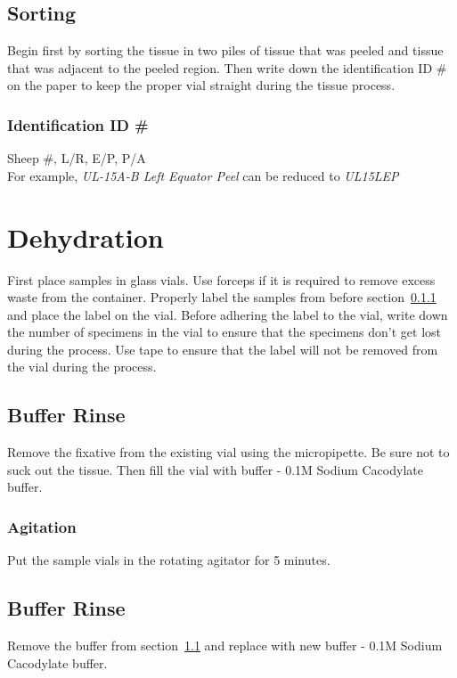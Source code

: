 \subsection{Sorting}\label{sorting}
Begin first by sorting the tissue in two piles of tissue that was peeled and
tissue that was adjacent to the peeled region.  Then write down the
identification ID \# on the paper to keep the proper vial straight during the
tissue process.  \\

\subsubsection{Identification ID \#}\label{identification}
Sheep \#, L/R, E/P, P/A\\

For example, {\it UL-15A-B Left Equator Peel} can be reduced to {\it UL15LEP}

\section{Dehydration}\label{dehydration}
First place samples in glass vials.  Use forceps if it is required to remove
excess waste from the container.  Properly label the samples from before
section~\ref{identification} and place the label on the vial.  Before adhering
the label to the vial, write down the number of specimens in the vial to ensure
that the specimens don't get lost during the process.  Use tape to ensure that
the label will not be removed from the vial during the process.

\subsection{Buffer Rinse}\label{buffer rinse}
Remove the fixative from the existing vial using the micropipette.  Be sure not
to suck out the tissue.  Then fill the vial with buffer - 0.1M Sodium
Cacodylate buffer.

\subsubsection{Agitation}\label{agitation 5}
Put the sample vials in the rotating agitator for 5 minutes.  

\subsection{Buffer Rinse}\label{buffer rinse 2}
Remove the buffer from section~\ref{buffer rinse} and replace with new buffer -
0.1M Sodium Cacodylate buffer.

